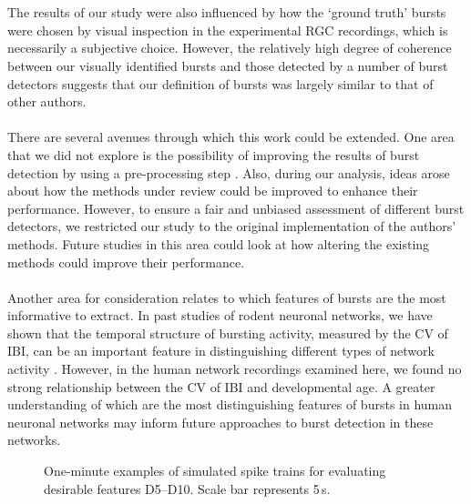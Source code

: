 \documentclass[12pt, titlepage]{article}
\begin{document}
	\\ \\The results of our study were also influenced by how the `ground truth' bursts were chosen by visual inspection in the experimental RGC recordings, which is necessarily a subjective choice. However, the relatively high degree of coherence between our visually identified bursts and those detected by a number of burst detectors suggests that our definition of bursts was largely similar to that of other authors.
	\\ \\There are several avenues through which this work could be extended. One area that we did not explore is the possibility of improving the results of burst detection by using a pre-processing step \cite{Martens2014}. Also, during our analysis, ideas arose about how the methods under review could be improved to enhance their performance. However, to ensure a fair and unbiased assessment of different burst detectors, we restricted our study to the original implementation of the authors' methods. Future studies in this area could look at how altering the existing methods could improve their performance. 
	\\ \\ Another area for consideration relates to which features of bursts are the most informative to extract. In past studies of rodent neuronal networks, we have shown that the temporal structure of bursting activity, measured by the CV of IBI, can be an important feature in distinguishing different types of network activity \cite{Charlesworth2015}. However, in the human network recordings examined here, we found no strong relationship between the CV of IBI and developmental age. A greater understanding of which are the most distinguishing features of bursts in human neuronal networks may inform future approaches to burst detection in these networks. 
	\pagebreak \\
		\begin{figure}[h]
			\centering
			\caption{One-minute examples of simulated spike trains for evaluating desirable features D5--D10. Scale bar represents 5$\,$s.}
			\label{sim_egs}
		\end{figure}
\end{document}
